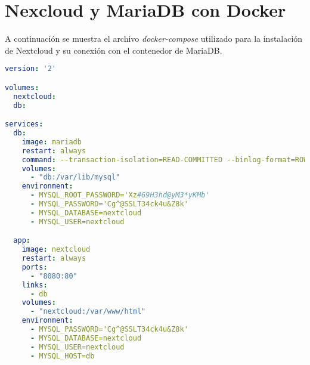 \chapter{Nexcloud y MariaDB con Docker}
\label{anexo:docker-compose}

A continuación se muestra el archivo \textit{docker-compose} utilizado para la instalación de Nextcloud y su conexión con el contenedor de MariaDB\cite{NextcloudDocker}.

\begin{lstlisting}[language=Yaml]
version: '2'

volumes:
  nextcloud:
  db:

services:
  db:
    image: mariadb
    restart: always
    command: --transaction-isolation=READ-COMMITTED --binlog-format=ROW
    volumes:
      - "db:/var/lib/mysql"
    environment:
      - MYSQL_ROOT_PASSWORD='Xz#69H3hd@yM3*yKMb'
      - MYSQL_PASSWORD='Cg^@SSLT34ck4u&Z8k'
      - MYSQL_DATABASE=nextcloud
      - MYSQL_USER=nextcloud

  app:
    image: nextcloud
    restart: always
    ports:
      - "8080:80"
    links:
      - db
    volumes:
      - "nextcloud:/var/www/html"
    environment:
      - MYSQL_PASSWORD='Cg^@SSLT34ck4u&Z8k'
      - MYSQL_DATABASE=nextcloud
      - MYSQL_USER=nextcloud
      - MYSQL_HOST=db
\end{lstlisting}